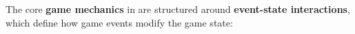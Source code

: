 
The core \textbf{game mechanics} in \benchmark{} are structured around \textbf{event-state interactions}, which define how game events modify the game state:

